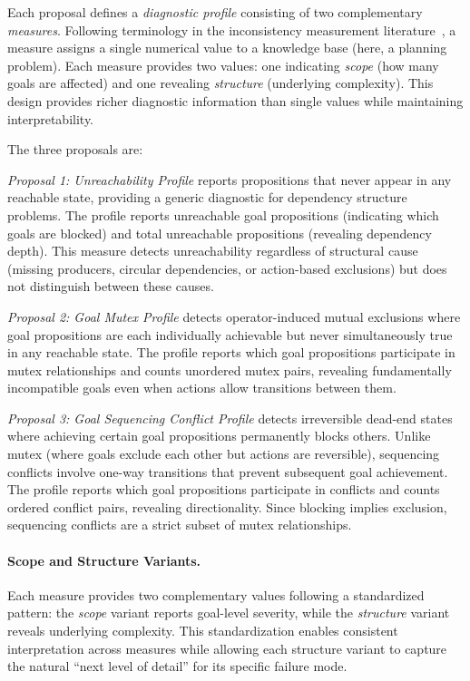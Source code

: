 Each proposal defines a \emph{diagnostic profile} consisting of two complementary \emph{measures}. Following terminology in the inconsistency measurement literature~\cite{Thimm2019}, a measure assigns a single numerical value to a knowledge base (here, a planning problem). Each measure provides two values: one indicating \emph{scope} (how many goals are affected) and one revealing \emph{structure} (underlying complexity). This design provides richer diagnostic information than single values while maintaining interpretability.

The three proposals are:

\emph{Proposal 1: Unreachability Profile} reports propositions that never appear in any reachable state, providing a generic diagnostic for dependency structure problems. The profile reports unreachable goal propositions (indicating which goals are blocked) and total unreachable propositions (revealing dependency depth). This measure detects unreachability regardless of structural cause (missing producers, circular dependencies, or action-based exclusions) but does not distinguish between these causes.

\emph{Proposal 2: Goal Mutex Profile} detects operator-induced mutual exclusions where goal propositions are each individually achievable but never simultaneously true in any reachable state. The profile reports which goal propositions participate in mutex relationships and counts unordered mutex pairs, revealing fundamentally incompatible goals even when actions allow transitions between them.

\emph{Proposal 3: Goal Sequencing Conflict Profile} detects irreversible dead-end states where achieving certain goal propositions permanently blocks others. Unlike mutex (where goals exclude each other but actions are reversible), sequencing conflicts involve one-way transitions that prevent subsequent goal achievement. The profile reports which goal propositions participate in conflicts and counts ordered conflict pairs, revealing directionality. Since blocking implies exclusion, sequencing conflicts are a strict subset of mutex relationships.

\paragraph{Scope and Structure Variants.}

Each measure provides two complementary values following a standardized pattern: the \emph{scope} variant reports goal-level severity, while the \emph{structure} variant reveals underlying complexity. This standardization enables consistent interpretation across measures while allowing each structure variant to capture the natural ``next level of detail'' for its specific failure mode.

